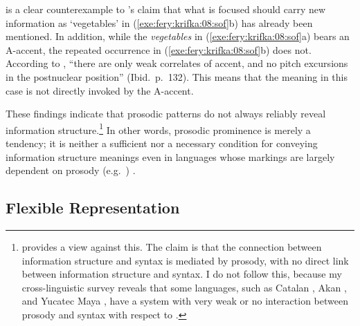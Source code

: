 

\noindent {} is a clear counterexample to
\citet{halliday:67}'s claim that what is focused should carry new
information as `vegetables' in (\ref{exe:fery:krifka:08:sof}b) has
already been mentioned.  In addition, while the \textit{vegetables} in
(\ref{exe:fery:krifka:08:sof}a) bears an A-accent, the repeated
occurrence in (\ref{exe:fery:krifka:08:sof}b) does not.  According to
\citeauthor{fery:krifka:08}, ``there are only weak correlates of
accent, and no pitch excursions in the postnuclear position''
(Ibid.\ p.\ 132). This means that the  meaning in this case is
not directly invoked by the A-accent.




These findings indicate that prosodic patterns do not always reliably
reveal information structure.\footnote{\citet{fanselow:07} provides a
  view against this. The claim is that the connection between
  information structure and syntax is mediated by prosody,
  with no direct link between information structure and syntax.  I do
  not follow this, because my cross-linguistic survey reveals that
  some languages, such as Catalan \citep{engdahl:vallduvi:96}, Akan
  \citep{drubig:03}, and Yucatec Maya \citep{kugler:etal:07}, have a
  system with very weak or no interaction between prosody and syntax
  with respect to .} In other words, prosodic prominence is
merely a tendency; it is neither a sufficient nor a necessary
condition for conveying information structure meanings even in
languages whose markings are largely dependent on prosody
(e.g.\ ) \citep{rochemont:86,drubig:03}.





\subsection{Flexible Representation}
\label{4:ssec:flexible}


